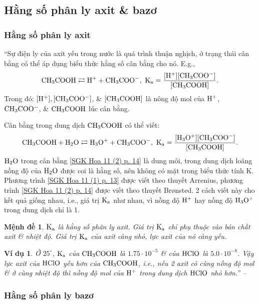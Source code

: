 \documentclass[oneside]{book}
\numberwithin{equation}{section}
\newtheorem{vidu}{Ví dụ}[section]
\newtheorem{menhde}{Mệnh đề}[section]
\begin{document}
\subsection{Hằng số phân ly axit \& bazơ}

\subsubsection{Hằng số phân ly axit}
``Sự điện ly của axit yếu trong nước là quá trình thuận nghịch, ở trạng thái cân bằng có thể áp dụng biểu thức hằng số cân bằng cho nó. E.g.,
\begin{align}
	\label{SGK Hoa 11 (1) p. 13}
	\rm CH_3COOH\rightleftarrows H^+ + CH_3COO^-,\ K_a = \frac{[H^+][CH_3COO^-]}{[CH_3COOH]}.
\end{align}
Trong đó: $\rm [H^+],[CH_3COO^-]$, \& $\rm [CH_3COOH]$ là nông độ mol của $\rm H^+$, $\rm CH_3COO^-$, \& $\rm CH_3COOH$ lúc cân bằng.

Cân bằng trong dung dịch $\rm CH_3COOH$ có thể viết:
\begin{align}
	\label{SGK Hoa 11 (2) p. 14}
	\rm CH_3COOH + H_2O\rightleftarrows H_3O^+ + CH_3COO^-,\ K_a = \frac{[H_3O^+][CH_3COO^-]}{[CH_3COOH]}.
\end{align}
$\rm H_2O$ trong cân bằng \eqref{SGK Hoa 11 (2) p. 14} là dung môi, trong dung dịch loãng nồng độ của $\rm H_2O$ được coi là hằng số, nên không có mặt trong biểu thức tính K. Phương trình \eqref{SGK Hoa 11 (1) p. 13} được viết theo thuyết Arrenius, phương trình \eqref{SGK Hoa 11 (2) p. 14} được viết theo thuyết Br\o nsted. 2 cách viết này cho kết quả giống nhau, i.e., giá trị $\rm K_a$ như nhau, vì nồng độ $\rm H^+$ hay nồng độ $\rm H_3O^+$ trong dung dịch chỉ là 1.

\begin{menhde}
	$\rm K_a$ là \emph{hằng số phân ly axit}. Giá trị $\rm K_a$ chỉ phụ thuộc vào bản chất axit \& nhiệt độ. Giá trị $\rm K_a$ của axit càng nhỏ, lực axit của nó càng yếu.
\end{menhde}

\begin{vidu}
	Ở $25^\circ$, $\rm K_a$ của $\rm CH_3COOH$ là $1.75\cdot 10^{-5}$ \& của $\rm HClO$ là $5.0\cdot 10^{-8}$. Vậy lực axit của $\rm HClO$ yếu hơn của $\rm CH_3COOH$, i.e., nếu 2 axit có cùng nồng độ mol \& ở cùng nhiệt độ thì nồng độ mol của $\rm H^+$ trong dung dịch $\rm HClO$ nhỏ hơn.'' -- \cite[pp. 13--14]{SGK_Hoa_Hoc_11_nang_cao}
\end{vidu}

\subsubsection{Hằng số phân ly bazơ}
\end{document}
